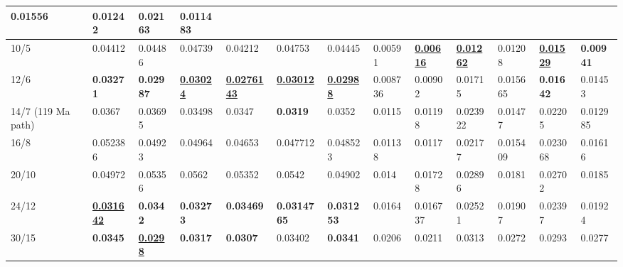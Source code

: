 \begin{landscape}
\begin{table*}
{\begin{tabular}{|l|l|l|l|l|l|l|l|l|l|l|l|l|}
{  \textbf{0.01556}} & 0.01242 & 0.02163 & 0.011483 \\ \hline
10/5 & 0.04412 & 0.04486 & 0.04739 & 0.04212 & 0.04753 & 0.04445 &
  0.00591 & {\color[HTML]{009901} {\ul\textbf{0.00616}}} & {\color[HTML]{009901} {\ul\textbf{0.01262}}} & 0.01208 &
  {\color[HTML]{009901} {\ul\textbf{0.01529}}} & {\color[HTML]{34FF34} \textbf{0.00941}} \\ \hline
12/6 & {\color[HTML]{32CB00} \textbf{0.03271}} & {\color[HTML]{32CB00}
  \textbf{0.02987}} & {\color[HTML]{009901} {\ul\textbf{0.03024}}} &
  {\color[HTML]{009901} {\ul\textbf{0.0276143}}} & {\color[HTML]{009901}
  {\ul\textbf{0.03012}}} & {\color[HTML]{009901} {\ul\textbf{0.02988}}} & 0.008736
  & 0.00902 & 0.01715 & 0.015665 & {\color[HTML]{32CB00} \textbf{0.01642}} &
  0.01453 \\ \hline
14/7 (119\textendash0 Ma path) & 0.0367 & 0.03695 & 0.03498 & 0.0347 &
  {\color[HTML]{34FF34} \textbf{0.0319}} & 0.0352 & 0.0115 & 0.01198 & 0.023922
  & 0.01477 & 0.02205 & 0.012985 \\ \hline
16/8 & 0.052386 & 0.04923 & 0.04964 & 0.04653 & 0.047712 & 0.048523 & 0.01138
  & 0.0117 & 0.02177 & 0.015409 & 0.023068 &
  0.01616 \\ \hline
20/10 & 0.04972 & 0.05356 & 0.0562 & 0.05352 & 0.0542 & 0.04902 & 0.014 &
  0.01728 & 0.02896 & 0.0181 & 0.02702 & 0.0185 \\ \hline
24/12 & {\color[HTML]{009901} {\ul\textbf{0.031642}}} & {\color[HTML]{34FF34}
  \textbf{0.0342}} & {\color[HTML]{34FF34} \textbf{0.03273}} &
  {\color[HTML]{34FF34} \textbf{0.03469}} & {\color[HTML]{32CB00} \textbf{0.0314765}} & {\color[HTML]{32CB00} \textbf{0.031253}} & 0.0164 &
  0.016737 & 0.02521 & 0.01907 & 0.02397 & 0.01924 \\ \hline
30/15 & {\color[HTML]{34FF34} \textbf{0.0345}} & {\color[HTML]{009901} {\ul\textbf{0.0298}}} & {\color[HTML]{32CB00} \textbf{0.0317}} &
  {\color[HTML]{32CB00} \textbf{0.0307}} & 0.03402 & {\color[HTML]{34FF34}
  \textbf{0.0341}} & 0.0206 & 0.0211 & 0.0313 & 0.0272 & 0.0293 & 0.0277 \\ \hline
\end{tabular}%
}
\end{table*}
\end{landscape}
